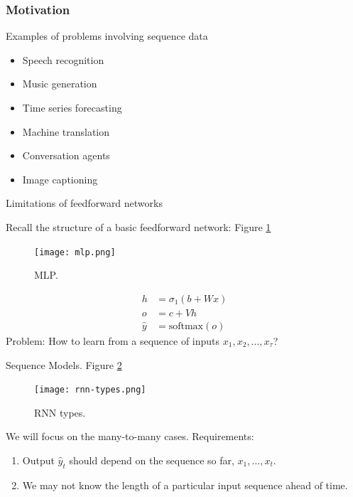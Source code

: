 \documentclass[english]{article}
\begin{document}
\subsubsection{Motivation} %
\benum
\item 
 {Examples of problems involving sequence data}
\begin{itemize}
\item Speech recognition
\item Music generation
\item Time series forecasting
\item Machine translation
\item Conversation agents
\item Image captioning
\end{itemize}
 

\item 
 {Limitations of feedforward networks}

Recall the structure of a basic feedforward network:  Figure \ref{MLP}
\begin{figure}
  \centering
\texttt{[image: mlp.png]}
    \caption{MLP.}
    \label{MLP}
\end{figure}

\begin{align*}
h &= \sigma_1(b+Wx)\\
o &= c+Vh\\
\hat{y} &= \text{softmax}(o)
\end{align*}
Problem: How to learn from a sequence of inputs $x_1, x_2,\dots,x_\tau$?

 

\item 
 {Sequence Models}.  Figure \ref{rnn-types}

\begin{figure}
  \centering
\texttt{[image: rnn-types.png]}
    \caption{RNN types.}
    \label{rnn-types}
\end{figure}
We will focus on the many-to-many cases. Requirements:
\begin{enumerate}
\item Output $\hat{y}_t$ should depend on the sequence so far, $x_1,\dots,x_t$.
\item We may not know the length of a particular input sequence ahead of time.
\end{enumerate}
\eenum
\end{document}

